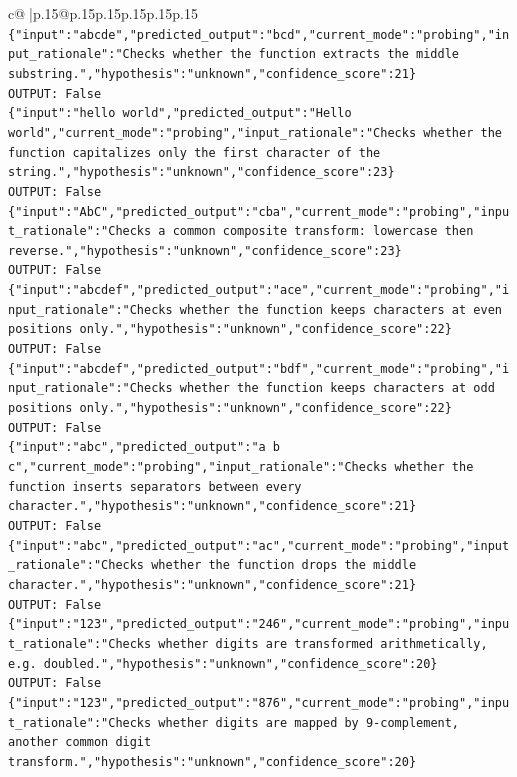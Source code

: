 \documentclass{article}
\begin{document}
{\begin{supertabular}{c@{$\;$}|p{.15\linewidth}@{}p{.15\linewidth}p{.15\linewidth}p{.15\linewidth}p{.15\linewidth}p{.15\linewidth}}
{{{\texttt{\{"input":"abcde","predicted\_output":"bcd","current\_mode":"probing","input\_rationale":"Checks whether the function extracts the middle substring.","hypothesis":"unknown","confidence\_score":21\}} \\
\texttt{OUTPUT: False} \\
\texttt{\{"input":"hello world","predicted\_output":"Hello world","current\_mode":"probing","input\_rationale":"Checks whether the function capitalizes only the first character of the string.","hypothesis":"unknown","confidence\_score":23\}} \\
\texttt{OUTPUT: False} \\
\texttt{\{"input":"AbC","predicted\_output":"cba","current\_mode":"probing","input\_rationale":"Checks a common composite transform: lowercase then reverse.","hypothesis":"unknown","confidence\_score":23\}} \\
\texttt{OUTPUT: False} \\
\texttt{\{"input":"abcdef","predicted\_output":"ace","current\_mode":"probing","input\_rationale":"Checks whether the function keeps characters at even positions only.","hypothesis":"unknown","confidence\_score":22\}} \\
\texttt{OUTPUT: False} \\
\texttt{\{"input":"abcdef","predicted\_output":"bdf","current\_mode":"probing","input\_rationale":"Checks whether the function keeps characters at odd positions only.","hypothesis":"unknown","confidence\_score":22\}} \\
\texttt{OUTPUT: False} \\
\texttt{\{"input":"abc","predicted\_output":"a b c","current\_mode":"probing","input\_rationale":"Checks whether the function inserts separators between every character.","hypothesis":"unknown","confidence\_score":21\}} \\
\texttt{OUTPUT: False} \\
\texttt{\{"input":"abc","predicted\_output":"ac","current\_mode":"probing","input\_rationale":"Checks whether the function drops the middle character.","hypothesis":"unknown","confidence\_score":21\}} \\
\texttt{OUTPUT: False} \\
\texttt{\{"input":"123","predicted\_output":"246","current\_mode":"probing","input\_rationale":"Checks whether digits are transformed arithmetically, e.g. doubled.","hypothesis":"unknown","confidence\_score":20\}} \\
\texttt{OUTPUT: False} \\
\texttt{\{"input":"123","predicted\_output":"876","current\_mode":"probing","input\_rationale":"Checks whether digits are mapped by 9{-}complement, another common digit transform.","hypothesis":"unknown","confidence\_score":20\}} \\
}}}
\end{supertabular}}
\end{document}
